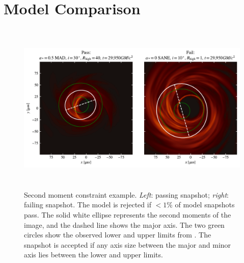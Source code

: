 \section{Model Comparison}\label{sec:comparisons}

\begin{figure}
  \centering
  \includegraphics[height=3.25in]{figures/passfail_sz.pdf}
  \caption{Second moment constraint example.
    \emph{Left}: passing snapshot;
    \emph{right}: failing snapshot.
    The model is rejected if $< 1\%$ of model snapshots pass.
    The solid white ellipse  represents the second moments of the image, and the dashed line shows the major axis.
    The two green circles show the observed lower and upper limits from .
    The snapshot is accepted if any axis size between the major and minor axis lies between the lower and upper limits.}
  \label{fig:passfail_sz}
\end{figure}

